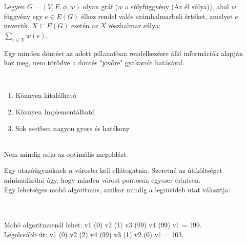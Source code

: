 \begin{frame}
\begin{tcolorbox}[title={Gráf súlya}]
Legyen $G = (V, E, {\phi}, w)$ olyan gráf ($w$ a súlyfüggvény (Az él súlya)), ahol $w$ függvény egy $e \in E(G)$ élhez rendel valós számhalmazbeli értéket, amelyet $e$  nevezük. $X \subseteq E(G)$ esetén az $X$ részhalmaz súlya:\\
\mmedskip
$\sum_{e \in X} w(e)$.
\end{tcolorbox}

\begin{tcolorbox}[title={Def.: Mohó algoritmus}]
Egy  minden döntést az adott pillanatban rendelkezésre álló információk alapján hoz meg, nem törődve a döntés "jövőre" gyakorolt hatásával.
\end{tcolorbox}

\begin{tcolorbox}[title={Ész}]
\\
\mmedskip
\begin{enumerate}
\item Könnyen kitalálható
\item Könnyen Implementálható
\item Sok esetben nagyon gyors és hatékony
\end{enumerate}
\\
Nem mindíg adja az optimális megoldást.
\end{tcolorbox}
\end{frame}


\begin{frame}
\begin{tcolorbox}[title={Ellenpélda: TSP / Travelling Salesman Problem}]
Egy utazóügynöknek $n$ városba kell ellátogatnia. Szeretné az útiköltséget minimalizálni úgy, hogy minden várost pontosan egyszer érintsen.\\
\tcblower
Egy lehetséges mohó algoritmus, amikor mindíg a legrövideb utat választja:\\
\\
\mmedskip
{}
\GraphInit[vstyle=Normal]
\SetVertexSimple[MinSize    = 16pt, LineColor = black, FillColor = mygreen]
\\
\mmedskip
Mohó algoritmusnál lehet: v1 (0) v2 (1) v3 (99) v4 (99) v1 = 199.\\
Legolcsóbb út: v1 (0) v2 (2) v4 (99) v3 (1) v2 (0) v1 = 103.
\end{tcolorbox}
\end{frame}

